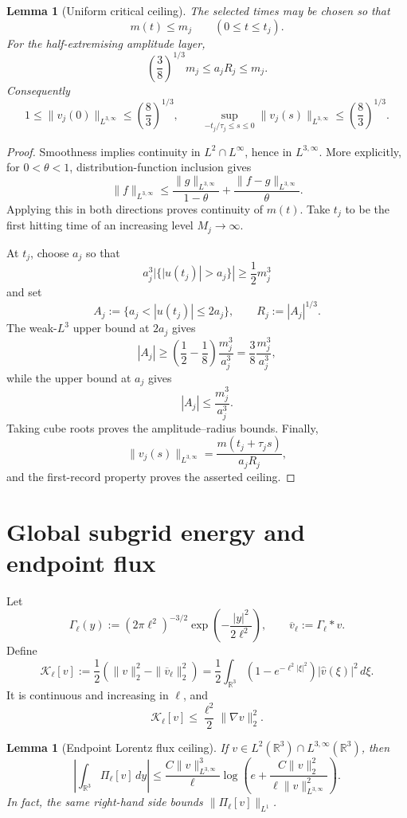 \documentclass[11pt]{article}
\newtheorem{lemma}[theorem]{Lemma}
\theoremstyle{definition}
\theoremstyle{remark}
\newcommand{\R}{\mathbb{R}}
\newcommand{\cK}{\mathcal{K}}
\newcommand{\Lweak}{L^{3,\infty}}
\begin{document}
\begin{lemma}[Uniform critical ceiling]
The selected times may be chosen so that
\[
 m(t)\le m_j \qquad (0\le t\le t_j).
\]
For the half-extremising amplitude layer,
\[
 \left(\frac38\right)^{1/3}m_j
 \le a_jR_j\le m_j.
\]
Consequently
\[
 1\le\|v_j(0)\|_{\Lweak}\le\left(\frac83\right)^{1/3},
 \qquad
 \sup_{-t_j/\tau_j\le s\le0}
 \|v_j(s)\|_{\Lweak}
 \le\left(\frac83\right)^{1/3}.
\]
\end{lemma}

\begin{proof}
Smoothness implies continuity in \(L^2\cap L^\infty\), hence in
\(\Lweak\).  More explicitly, for \(0<\theta<1\), distribution-function
inclusion gives
\[
 \|f\|_{\Lweak}
 \le \frac{\|g\|_{\Lweak}}{1-\theta}
 +\frac{\|f-g\|_{\Lweak}}{\theta}.
\]
Applying this in both directions proves continuity of \(m(t)\).  Take
\(t_j\) to be the first hitting time of an increasing level \(M_j\to\infty\).

At \(t_j\), choose \(a_j\) so that
\[
 a_j^3|\{|u(t_j)|>a_j\}|\ge\frac12m_j^3
\]
and set
\[
 A_j:=\{a_j<|u(t_j)|\le2a_j\},
 \qquad R_j:=|A_j|^{1/3}.
\]
The weak-\(L^3\) upper bound at \(2a_j\) gives
\[
 |A_j|\ge
 \left(\frac12-\frac18\right)\frac{m_j^3}{a_j^3}
 =\frac38\frac{m_j^3}{a_j^3},
\]
while the upper bound at \(a_j\) gives
\[
 |A_j|\le\frac{m_j^3}{a_j^3}.
\]
Taking cube roots proves the amplitude--radius bounds.  Finally,
\[
 \|v_j(s)\|_{\Lweak}
 =\frac{m(t_j+\tau_js)}{a_jR_j},
\]
and the first-record property proves the asserted ceiling.
\end{proof}

\section{Global subgrid energy and endpoint flux}

Let
\[
 \Gamma_\ell(y):=(2\pi\ell^2)^{-3/2}
 \exp\!\left(-\frac{|y|^2}{2\ell^2}\right),
 \qquad
 \overline v_\ell:=\Gamma_\ell*v.
\]
Define
\[
 \cK_\ell[v]
 :=\frac12\left(\|v\|_2^2-\|\overline v_\ell\|_2^2\right)
 =\frac12\int_{\R^3}
 \left(1-e^{-\ell^2|\xi|^2}\right)|\widehat v(\xi)|^2\,d\xi.
\]
It is continuous and increasing in \(\ell\), and
\[
 \cK_\ell[v]\le\frac{\ell^2}{2}\|\nabla v\|_2^2.
\]

\begin{lemma}[Endpoint Lorentz flux ceiling]
If \(v\in L^2(\R^3)\cap\Lweak(\R^3)\), then
\[
 \left|\int_{\R^3}\Pi_\ell[v]\,dy\right|
 \le
 \frac{C\|v\|_{\Lweak}^3}{\ell}
 \log\!\left(
 e+\frac{C\|v\|_2^2}
 {\ell\|v\|_{\Lweak}^2}
 \right).
\]
In fact, the same right-hand side bounds
\(\|\Pi_\ell[v]\|_{L^1}\).
\end{lemma}
\end{document}
